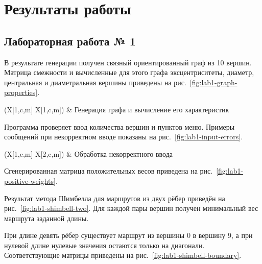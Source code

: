 \section{Результаты работы}
\label{sec:work-results}

\subsection{Лабораторная работа № 1}

В результате генерации получен связный ориентированный граф из 10 вершин. Матрица смежности и вычисленные для этого графа эксцентриситеты, диаметр, центральная и диаметральная вершины приведены на рис.~\ref{fig:lab1-graph-properties}.

\imgGrid[1ex](X[1,c,m] X[1,c,m]){
     &
}{Генерация графа и вычисление его характеристик}{\label{fig:lab1-graph-properties}}

Программа проверяет ввод количества вершин и пунктов меню. Примеры сообщений при некорректном вводе показаны на рис.~\ref{fig:lab1-input-errors}.

\imgGrid[1ex](X[1,c,m] X[2,c,m]){
     &
}{Обработка некорректного ввода}{\label{fig:lab1-input-errors}}

Сгенерированная матрица положительных весов приведена на рис.~\ref{fig:lab1-positive-weights}.


Результат метода Шимбелла для маршрутов из двух рёбер приведён на рис.~\ref{fig:lab1-shimbell-two}. Для каждой пары вершин получен минимальный вес маршрута заданной длины.


При длине девять рёбер существует маршрут из вершины 0 в вершину 9, а при нулевой длине нулевые значения остаются только на диагонали. Соответствующие матрицы приведены на рис.~\ref{fig:lab1-shimbell-boundary}.


